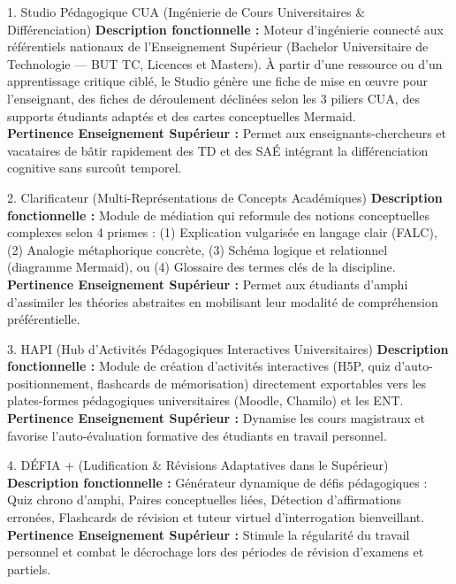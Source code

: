 \documentclass[11pt,a4paper]{article}
\begin{document}
\begin{featureBox}[softPurple]{1. Studio Pédagogique CUA (Ingénierie de Cours Universitaires \& Différenciation)}
\textbf{Description fonctionnelle :} Moteur d'ingénierie connecté aux référentiels nationaux de l'Enseignement Supérieur (Bachelor Universitaire de Technologie --- BUT TC, Licences et Masters). À partir d'une ressource ou d'un apprentissage critique ciblé, le Studio génère une fiche de mise en œuvre pour l'enseignant, des fiches de déroulement déclinées selon les 3 piliers CUA, des supports étudiants adaptés et des cartes conceptuelles Mermaid.\\
\textbf{Pertinence Enseignement Supérieur :} Permet aux enseignants-chercheurs et vacataires de bâtir rapidement des TD et des SAÉ intégrant la différenciation cognitive sans surcoût temporel.
\end{featureBox}

\begin{featureBox}[accentBlue]{2. Clarificateur (Multi-Représentations de Concepts Académiques)}
\textbf{Description fonctionnelle :} Module de médiation qui reformule des notions conceptuelles complexes selon 4 prismes : (1) Explication vulgarisée en langage clair (FALC), (2) Analogie métaphorique concrète, (3) Schéma logique et relationnel (diagramme Mermaid), ou (4) Glossaire des termes clés de la discipline.\\
\textbf{Pertinence Enseignement Supérieur :} Permet aux étudiants d'amphi d'assimiler les théories abstraites en mobilisant leur modalité de compréhension préférentielle.
\end{featureBox}

\begin{featureBox}[amberOrange]{3. HAPI (Hub d'Activités Pédagogiques Interactives Universitaires)}
\textbf{Description fonctionnelle :} Module de création d'activités interactives (H5P, quiz d'auto-positionnement, flashcards de mémorisation) directement exportables vers les plates-formes pédagogiques universitaires (Moodle, Chamilo) et les ENT.\\
\textbf{Pertinence Enseignement Supérieur :} Dynamise les cours magistraux et favorise l'auto-évaluation formative des étudiants en travail personnel.
\end{featureBox}

\begin{featureBox}[emeraldGreen]{4. DÉFIA + (Ludification \& Révisions Adaptatives dans le Supérieur)}
\textbf{Description fonctionnelle :} Générateur dynamique de défis pédagogiques : Quiz chrono d'amphi, Paires conceptuelles liées, Détection d'affirmations erronées, Flashcards de révision et tuteur virtuel d'interrogation bienveillant.\\
\textbf{Pertinence Enseignement Supérieur :} Stimule la régularité du travail personnel et combat le décrochage lors des périodes de révision d'examens et partiels.
\end{featureBox}
\end{document}
